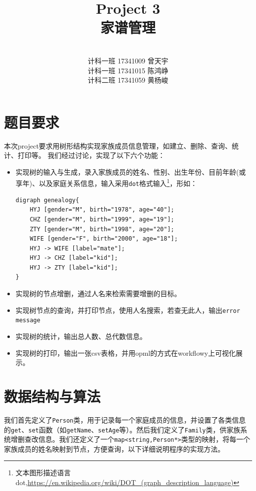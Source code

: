 \documentclass[12pt,UTF8]{ctexart}
\title{{\Huge Project 3\\家谱管理}}
\author{\vspace{200pt}\quad\\
计科一班 17341009 曾天宇\\
计科一班 17341015 陈鸿峥\\
计科二班 17341059 黄杨峻}
\date{}
\begin{document}
\begin{spacing}{1.4}

\clearpage\maketitle
\thispagestyle{empty}

\newpage
\setcounter{page}{1}
\section{题目要求}
	本次project要求用树形结构实现家族成员信息管理，如建立、删除、查询、统计、打印等。
	我们经过讨论，实现了以下六个功能：
	\begin{itemize}
		\item 实现树的输入与生成，录入家族成员的姓名、性别、出生年份、目前年龄(或享年)、以及家庭关系信息，输入采用\verb'dot'格式输入\footnote{文本图形描述语言dot,\url{https://en.wikipedia.org/wiki/DOT_(graph_description_language)}}，形如：
\begin{center}
\begin{lstlisting}
digraph genealogy{
	HYJ [gender="M", birth="1978", age="40"];
	CHZ [gender="M", birth="1999", age="19"];
	ZTY [gender="M", birth="1998", age="20"];
	WIFE [gender="F", birth="2000", age="18"];
	HYJ -> WIFE [label="mate"];
	HYJ -> CHZ [label="kid"];
	HYJ -> ZTY [label="kid"];
}
\end{lstlisting}
\end{center}
		\item 实现树的节点增删，通过人名来检索需要增删的目标。
		\item 实现树节点的查询，并打印节点，使用人名搜索，若查无此人，输出\verb'error message'
		\item 实现树的统计，输出总人数、总代数信息。
		\item 实现树的打印，输出一张csv表格，并用opml的方式在workflowy上可视化展示。
	\end{itemize}

\section{数据结构与算法}
	我们首先定义了\verb'Person'类，用于记录每一个家庭成员的信息，并设置了各类信息的\verb'get'、\verb'set'函数（如\verb'getName'、\verb'setAge'等）。然后我们定义了\verb'Family'类，供家族系统增删查改信息。我们还定义了一个\verb'map<string,Person*>'类型的映射，将每一个家族成员的姓名映射到节点，方便查询，以下详细说明程序的实现方法。


\end{spacing}
\end{document}
